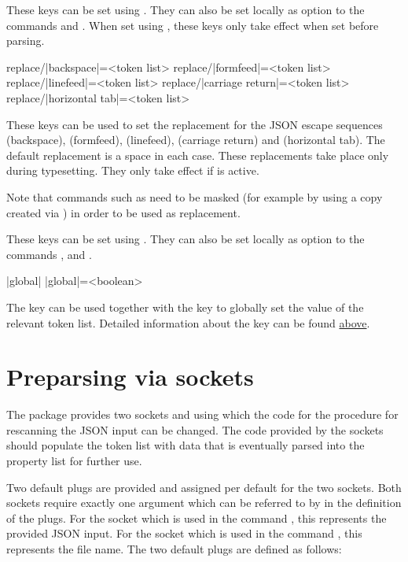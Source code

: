 \documentclass[a4paper]{article}
\begin{document}
{{These keys can be set using \macro{\JSONParseSet}. They can also be set locally as option to the commands \macro{\JSONParse} and \macro{\JSONParseFromFile}. When set using \macro{\JSONParseSet}, these keys only take effect when set before parsing.

\begin{macrodef}
replace/|backspace|={<token list>}
replace/|formfeed|={<token list>}
replace/|linefeed|={<token list>}
replace/|carriage return|={<token list>}
replace/|horizontal tab|={<token list>}
\end{macrodef}
These keys can be used to set the replacement for the JSON escape sequences \macro{\b} (backspace), \macro{\f} (formfeed), \macro{\n} (linefeed), \macro{\r} (carriage return) and \macro{\t} (horizontal tab). The default replacement is a space in each case. These replacements take place only during typesetting. They only take effect if  is active.

\warning Note that commands such as \macro{\par} need to be masked (for example by using a copy created via \macro{\let}) in order to be used as replacement.

These keys can be set using \macro{\JSONParseSet}. They can also be set locally as option to the commands \macro{\JSONParseValue}, \macro{\JSONParseArrayUse} and \macro{\JSONParseArrayMapFunction}.

\begin{macrodef}
|global|
|global|={<boolean>}
\end{macrodef}
The key  can be used together with the key  to globally set the value of the relevant token list. Detailed information about the key  can be found \hyperlink{key:storein}{above}.

\section{Preparsing via sockets}

The package provides two sockets  and  using which the code for the procedure for rescanning the JSON input can be changed. The code provided by the sockets should populate the token list  with data that is eventually parsed into the property list for further use.

Two default plugs are provided and assigned per default for the two sockets. Both sockets require exactly one argument which can be referred to by  in the definition of the plugs. For the socket  which is used in the command \macro{\JSONParse}, this represents the provided JSON input. For the socket  which is used in the command \macro{\JSONParseFromFile}, this represents the file name. The two default plugs are defined as follows:

}}
\end{document}
